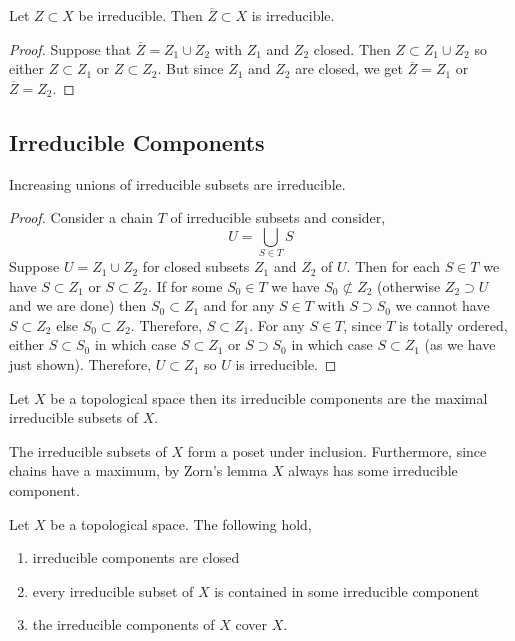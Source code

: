 \documentclass[12pt]{article}
\begin{document}
\begin{lemma}
Let $Z \subset X$ be irreducible. Then $\overline{Z} \subset X$ is irreducible.
\end{lemma}

\begin{proof}
Suppose that $\overline{Z} = Z_1 \cup Z_2$ with $Z_1$ and $Z_2$ closed. Then $Z \subset Z_1 \cup Z_2$ so either $Z \subset Z_1$ or $Z \subset Z_2$. But since $Z_1$ and $Z_2$ are closed, we get $\overline{Z} = Z_1$ or $\overline{Z} = Z_2$. 
\end{proof}


\subsection{Irreducible Components}


\begin{lemma}
Increasing unions of irreducible subsets are irreducible.
\end{lemma}

\begin{proof}
Consider a chain $T$ of irreducible subsets and consider,
\[ U = \bigcup_{S \in T} S \]
Suppose $U = Z_1 \cup Z_2$ for closed subsets $Z_1$ and $Z_2$ of $U$. Then for each $S \in T$ we have $S \subset Z_1$ or $S \subset Z_2$. If for some $S_0 \in T$ we have $S_0 \not\subset Z_2$ (otherwise $Z_2 \supset U$ and we are done) then $S_0 \subset Z_1$ and for any $S \in T$ with $S \supset S_0$ we cannot have $S \subset Z_2$ else $S_0 \subset Z_2$. Therefore, $S \subset Z_1$. For any $S \in T$, since $T$ is totally ordered, either $S \subset S_0$ in which case $S \subset Z_1$ or $S \supset S_0$ in which case $S \subset Z_1$ (as we have just shown). Therefore, $U \subset Z_1$ so $U$ is irreducible.
\end{proof}

\begin{defn}
Let $X$ be a topological space then its irreducible components are the maximal irreducible subsets of $X$.
\end{defn}

\begin{rmk}
The irreducible subsets of $X$ form a poset under inclusion. Furthermore, since chains have a maximum, by Zorn's lemma $X$ always has some irreducible component.  
\end{rmk}

\begin{lemma}
Let $X$ be a topological space. The following hold,
\begin{enumerate}
\item irreducible components are closed
\item every irreducible subset of $X$ is contained in some irreducible component
\item the irreducible components of $X$ cover $X$.
\end{enumerate}
\end{lemma}
\end{document}
